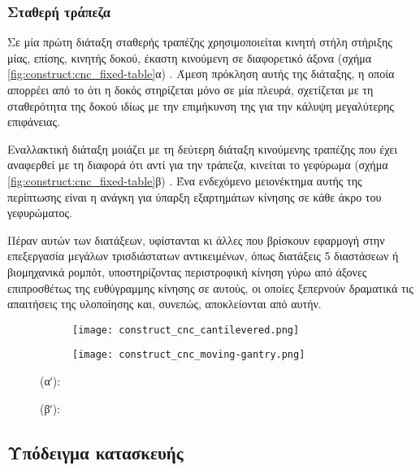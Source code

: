 \subsubsection{Σταθερή τράπεζα}

Σε μία πρώτη διάταξη σταθερής τραπέζης χρησιμοποιείται κινητή στήλη στήριξης
μίας, επίσης, κινητής δοκού, έκαστη κινούμενη σε διαφορετικό άξονα (σχήμα
\ref{fig:construct:cnc_fixed-table}α) \parencite[70]{albert11}. Άμεση πρόκληση
αυτής της διάταξης, η οποία απορρέει από το ότι η δοκός στηρίζεται μόνο σε μία
πλευρά, σχετίζεται με τη σταθερότητα της δοκού ιδίως με την επιμήκυνση της για
την κάλυψη μεγαλύτερης επιφάνειας.

Εναλλακτική διάταξη μοιάζει με τη δεύτερη διάταξη κινούμενης τραπέζης που έχει
αναφερθεί με τη διαφορά ότι αντί για την τράπεζα, κινείται το γεφύρωμα (σχήμα
\ref{fig:construct:cnc_fixed-table}β) \parencite[71]{albert11}.
Ένα ενδεχόμενο μειονέκτημα αυτής της περίπτωσης είναι η ανάγκη για ύπαρξη
εξαρτημάτων κίνησης σε κάθε άκρο του γεφυρώματος.

Πέραν αυτών των διατάξεων, υφίστανται κι άλλες που βρίσκουν εφαρμογή στην
επεξεργασία μεγάλων τρισδιάστατων αντικειμένων, όπως διατάξεις 5 διαστάσεων ή
βιομηχανικά ρομπότ, υποστηρίζοντας περιστροφική κίνηση γύρω από άξονες
επιπροσθέτως της ευθύγραμμης κίνησης σε αυτούς, οι οποίες ξεπερνούν δραματικά
τις απαιτήσεις της υλοποίησης και, συνεπώς, αποκλείονται από αυτήν.

\begin{figure}
    \caption{Διατάξεις σταθερής τραπέζης.
        \label{fig:construct:cnc_fixed-table}}
    \begin{center}
        \begin{subfigure}[b]{0.40\textwidth}
            \texttt{[image: construct\_cnc\_cantilevered.png]}
            \caption{}
        \end{subfigure}
        \begin{subfigure}[b]{0.40\textwidth}
            \texttt{[image: construct\_cnc\_moving-gantry.png]}
            \caption{}
        \end{subfigure}
    \end{center}

    (αʹ): 

    (βʹ): 
\end{figure}

\subsection{Υπόδειγμα κατασκευής}

